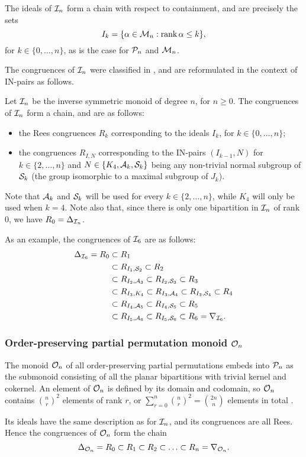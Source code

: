 The ideals of $\mathcal{I}_n$ form a chain with respect to containment, and are precisely
the sets $$I_k=\{\alpha \in \mathcal{M}_n : \operatorname{rank} \alpha \leq k\},$$ for
$k \in \{0, \ldots, n\}$, as is the case for $\mathcal{P}_n$ and $\mathcal{M}_n$.

The congruences of $\mathcal{I}_n$ were classified in \cite{liber_1953}, and are
reformulated in the context of IN-pairs as follows.
\begin{theorem}
  \label{thm:in-congs}
  Let $\mathcal{I}_n$ be the inverse symmetric monoid of degree $n$, for $n \geq 0$.  The
  congruences of $\mathcal{I}_n$ form a chain, and are as follows:
  \begin{itemize}
  \item the Rees congruences $R_k$ corresponding to the ideals $I_k$, for
    $k \in \{0, \ldots, n\}$;
  \item the congruences $R_{I,N}$ corresponding to the IN-pairs $(I_{k-1}, N)$
    for $k \in \{2, \ldots, n\}$ and $N \in \{K_4, \mathcal{A}_k, \mathcal{S}_k\}$ being any
    non-trivial normal subgroup of $\mathcal{S}_k$ (the group isomorphic to a maximal
    subgroup of $J_k$).
  \end{itemize}
\end{theorem}
Note that $\mathcal{A}_k$ and $\mathcal{S}_k$ will be used for every $k \in \{2, \ldots, n\}$,
while $K_4$ will only be used when $k=4$.  Note also that, since there is only
one bipartition in $\mathcal{I}_n$ of rank $0$, we have $R_0 = \Delta_{\mathcal{I}_n}$.

As an example, the congruences of $\mathcal{I}_6$ are as follows:
\begin{align*}
  \Delta_{\mathcal{I}_6} = R_0 & \subset R_1 \\
      & \subset R_{I_1,\mathcal{S}_2} \subset R_2 \\
      & \subset R_{I_2,\mathcal{A}_3} \subset R_{I_2, \mathcal{S}_3} \subset R_3 \\
      & \subset R_{I_3,K_4} \subset R_{I_3,\mathcal{A}_4} \subset R_{I_3, \mathcal{S}_4} \subset R_4 \\
      & \subset R_{I_4,\mathcal{A}_5} \subset R_{I_4, \mathcal{S}_5} \subset R_5 \\
      & \subset R_{I_5,\mathcal{A}_6} \subset R_{I_5, \mathcal{S}_6} \subset R_6 = \nabla_{\mathcal{I}_6}.
\end{align*}

\subsubsection{Order-preserving partial permutation monoid $\mathcal{O}_n$}
 The
monoid $\mathcal{O}_n$ of all order-preserving partial permutations embeds into $\mathcal{P}_n$
as the submonoid consisting of all the planar bipartitions with trivial kernel
and cokernel.  An element of $\mathcal{O}_n$ is defined by its domain and codomain, so
$\mathcal{O}_n$ contains $\binom{n}{r}^2$ elements of rank $r$, or
$\sum_{r=0}^n \binom{n}{r}^2 = \binom{2n}{n}$ elements in total
\cite[\href{https://oeis.org/A000984}{A000984}]{oeis}.

Its ideals have the same description as for $\mathcal{I}_n$, and
its congruences are all Rees.  Hence the congruences of $\mathcal{O}_n$ form the chain
$$\Delta_{\mathcal{O}_n} = R_0 \subset R_1 \subset R_2 \subset \ldots
\subset R_n = \nabla_{\mathcal{O}_n}.$$
